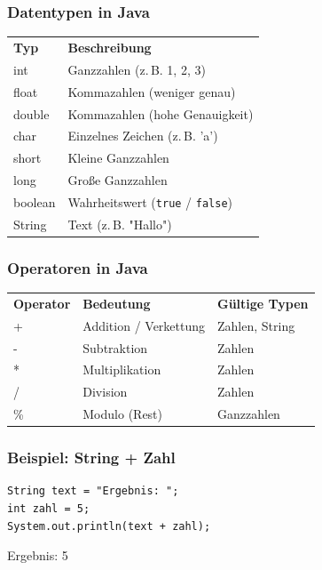 \documentclass{../../presentation}
\begin{document}
\begin{frame}
  \frametitle{Datentypen in Java}
  \pause
  \centering
  \begin{tabular}{l l}
    \rowcolor{tablehead}
    \textbf{Typ} & \textbf{Beschreibung}                          \\
    int          & Ganzzahlen (z.\,B. 1, 2, 3)                    \\
    float        & Kommazahlen (weniger genau)                    \\
    double       & Kommazahlen (hohe Genauigkeit)                 \\
    char         & Einzelnes Zeichen (z.\,B. 'a')                 \\
    short        & Kleine Ganzzahlen                              \\
    long         & Große Ganzzahlen                               \\
    boolean      & Wahrheitswert (\texttt{true} / \texttt{false}) \\
    String       & Text (z.\,B. "Hallo")                          \\
  \end{tabular}
\end{frame}


\begin{frame}
  \frametitle{Operatoren in Java}
  \pause
  \centering
  \begin{tabular}{l l l}
    \rowcolor{tablehead}
    \textbf{Operator} & \textbf{Bedeutung}    & \textbf{Gültige Typen} \\
    +                 & Addition / Verkettung & Zahlen, String         \\
    -                 & Subtraktion           & Zahlen                 \\
    *                 & Multiplikation        & Zahlen                 \\
    /                 & Division              & Zahlen                 \\
    \%                & Modulo (Rest)         & Ganzzahlen             \\
  \end{tabular}
\end{frame}

\begin{frame}[fragile]
  \frametitle{Beispiel: String + Zahl}
  \pause
  \begin{verbatim}
String text = "Ergebnis: ";
int zahl = 5;
System.out.println(text + zahl);
  \end{verbatim}
  \pause
  \begin{ausgabe}
    Ergebnis: 5
  \end{ausgabe}
\end{frame}
\end{document}
